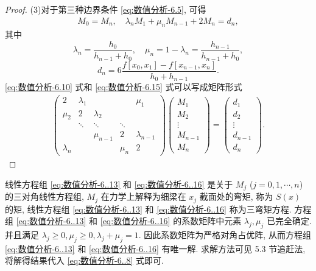 \documentclass[../../main.tex]{subfiles}
\begin{document}
\begin{proof}
(3)对于第三种边界条件 \eqref{eq:数值分析-6.5}, 可得
\begin{align}
M_0 = M_n, \quad \lambda_n M_1 + \mu_n M_{n - 1} + 2 M_n = d_n, \label{eq:数值分析-6.15}
\end{align}
其中
\[
\lambda_n = \frac{h_0}{h_{n - 1} + h_0}, \quad \mu_n = 1 - \lambda_n = \frac{h_{n - 1}}{h_{n - 1} + h_0},
\]
\[
d_n = 6 \frac{f[x_0, x_1] - f[x_{n - 1}, x_n]}{h_0 + h_{n - 1}}.
\]
\eqref{eq:数值分析-6.10} 式和 \eqref{eq:数值分析-6.15} 式可以写成矩阵形式
\begin{align}
\begin{pmatrix}
2 & \lambda_1 & & & \mu_1 \\
\mu_2 & 2 & \lambda_2 & & \\
& \ddots & \ddots & \ddots & \\
& & \mu_{n - 1} & 2 & \lambda_{n - 1} \\
\lambda_n & & & \mu_n & 2
\end{pmatrix}
\begin{pmatrix}
M_1 \\
M_2 \\
\vdots \\
M_{n - 1} \\
M_n
\end{pmatrix}
=
\begin{pmatrix}
d_1 \\
d_2 \\
\vdots \\
d_{n - 1} \\
d_n
\end{pmatrix}. \label{eq:数值分析-6..16}
\end{align}
\end{proof}
\begin{remark}
线性方程组 \eqref{eq:数值分析-6..13} 和 \eqref{eq:数值分析-6..16} 是关于 $M_j$ ($j = 0, 1, \cdots, n$) 的三对角线性方程组, $M_j$ 在力学上解释为细梁在 $x_j$ 截面处的弯矩, 称为 $S(x)$ 的矩, 线性方程组 \eqref{eq:数值分析-6..13} 和 \eqref{eq:数值分析-6..16} 称为三弯矩方程. 方程组 \eqref{eq:数值分析-6..13} 和 \eqref{eq:数值分析-6..16} 的系数矩阵中元素 $\lambda_j, \mu_j$ 已完全确定. 并且满足 $\lambda_j \geqslant 0, \mu_j \geqslant 0, \lambda_j + \mu_j = 1$. 因此系数矩阵为严格对角占优阵, 从而方程组 \eqref{eq:数值分析-6..13} 和 \eqref{eq:数值分析-6..16} 有唯一解. 求解方法可见 5.3 节追赶法, 将解得结果代入 \eqref{eq:数值分析-6..8} 式即可.
\end{remark}
\end{document}
